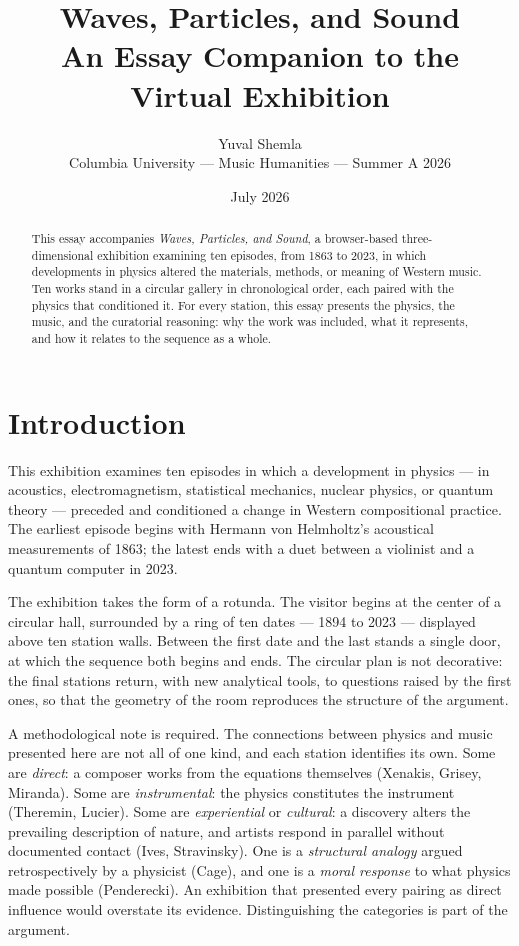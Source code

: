 \documentclass[11pt]{article}
\title{\textbf{Waves, Particles, and Sound}\\
\large An Essay Companion to the Virtual Exhibition}
\author{Yuval Shemla\\ \small Columbia University --- Music Humanities --- Summer A 2026}
\date{July 2026}
\begin{document}
\maketitle

\begin{abstract}
\noindent This essay accompanies \emph{Waves, Particles, and Sound}, a browser-based
three-dimensional exhibition examining ten episodes, from 1863 to 2023, in which developments
in physics altered the materials, methods, or meaning of Western music. Ten works stand in a
circular gallery in chronological order, each paired with the physics that conditioned it.
For every station, this essay presents the physics, the music, and the curatorial reasoning:
why the work was included, what it represents, and how it relates to the sequence as a whole.
\end{abstract}

\newpage
\tableofcontents
\newpage

\section{Introduction}

This exhibition examines ten episodes in which a development in physics --- in acoustics,
electromagnetism, statistical mechanics, nuclear physics, or quantum theory --- preceded and
conditioned a change in Western compositional practice. The earliest episode begins with
Hermann von Helmholtz's acoustical measurements of 1863; the latest ends with a duet between
a violinist and a quantum computer in 2023.

The exhibition takes the form of a rotunda. The visitor begins at the center of a circular
hall, surrounded by a ring of ten dates --- 1894 to 2023 --- displayed above ten station
walls. Between the first date and the last stands a single door, at which the sequence both
begins and ends. The circular plan is not decorative: the final stations return, with new
analytical tools, to questions raised by the first ones, so that the geometry of the room
reproduces the structure of the argument.

A methodological note is required. The connections between physics and music presented here
are not all of one kind, and each station identifies its own. Some are \emph{direct}: a
composer works from the equations themselves (Xenakis, Grisey, Miranda). Some are
\emph{instrumental}: the physics constitutes the instrument (Theremin, Lucier). Some are
\emph{experiential} or \emph{cultural}: a discovery alters the prevailing description of
nature, and artists respond in parallel without documented contact (Ives, Stravinsky). One is
a \emph{structural analogy} argued retrospectively by a physicist (Cage), and one is a
\emph{moral response} to what physics made possible (Penderecki). An exhibition that
presented every pairing as direct influence would overstate its evidence. Distinguishing the
categories is part of the argument.
\end{document}
